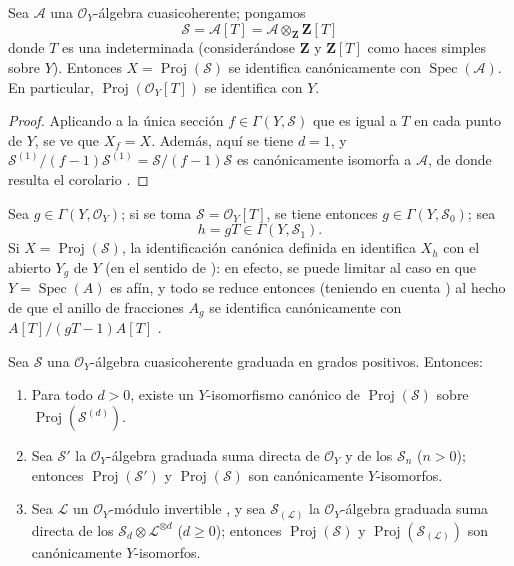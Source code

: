 \documentclass[oneside,10pt]{amsart}
\renewcommand{\geq}{\geqslant}
\newcommand{\oldpage}[2][]{\marginnote{\normalfont\footnotesize\textbf{#1}~|~#2}\ignorespaces}
\let\EGAOriginalLabel\label
\renewcommand{\label}[1]{\phantomsection\EGAOriginalLabel{#1}}
\begin{document}
\begin{corollary}[3.1.7]
\label{II.3.1.7-fr}
Sea $\mathcal{A}$ una $\mathcal{O}_Y$-álgebra cuasicoherente; pongamos
\[
  \mathcal{S}=\mathcal{A}[T]
  =\mathcal{A}\otimes_{\mathbf{Z}}\mathbf{Z}[T]
\]
donde $T$ es una indeterminada (considerándose $\mathbf{Z}$ y $\mathbf{Z}[T]$ como haces simples sobre $Y$).
Entonces $X=\operatorname{Proj}(\mathcal{S})$ se identifica canónicamente con $\operatorname{Spec}(\mathcal{A})$.
En particular, $\operatorname{Proj}(\mathcal{O}_Y[T])$ se identifica con $Y$.
\end{corollary}

\begin{proof}
Aplicando  a la única sección $f\in\Gamma(Y,\mathcal{S})$ que es igual a $T$ en cada punto de $Y$, se ve que $X_f=X$.
Además, aquí se tiene $d=1$, y $\mathcal{S}^{(1)}/(f-1)\mathcal{S}^{(1)}
=\mathcal{S}/(f-1)\mathcal{S}$ es canónicamente isomorfa a $\mathcal{A}$, de donde resulta el corolario .
\end{proof}

Sea $g\in\Gamma(Y,\mathcal{O}_Y)$; si se toma $\mathcal{S}=\mathcal{O}_Y[T]$, se tiene entonces $g\in\Gamma(Y,\mathcal{S}_0)$; sea
\[
  h=gT\in\Gamma(Y,\mathcal{S}_1).
\]
Si $X=\operatorname{Proj}(\mathcal{S})$, la identificación canónica definida en  identifica $X_h$ con el abierto $Y_g$ de $Y$ (en el sentido de ): en efecto, se puede limitar al caso en que $Y=\operatorname{Spec}(A)$ es afín, y todo se reduce entonces (teniendo en cuenta ) al hecho de que el anillo de fracciones $A_g$ se identifica canónicamente con $A[T]/(gT-1)A[T]$ .

\begin{proposition}[3.1.8]
\label{II.3.1.8-fr}
Sea $\mathcal{S}$ una $\mathcal{O}_Y$-álgebra cuasicoherente graduada en grados positivos.
Entonces:
\begin{enumerate}
  \item[(i)] Para todo $d>0$, existe un $Y$-isomorfismo canónico de $\operatorname{Proj}(\mathcal{S})$ sobre $\operatorname{Proj}(\mathcal{S}^{(d)})$.
\oldpage[II]{52}
  \item[(ii)] Sea $\mathcal{S}'$ la $\mathcal{O}_Y$-álgebra graduada suma directa de $\mathcal{O}_Y$ y de los $\mathcal{S}_n$ ($n>0$); entonces $\operatorname{Proj}(\mathcal{S}')$ y $\operatorname{Proj}(\mathcal{S})$ son canónicamente $Y$-isomorfos.
  \item[(iii)] Sea $\mathcal{L}$ un $\mathcal{O}_Y$-módulo invertible , y sea $\mathcal{S}_{(\mathcal{L})}$ la $\mathcal{O}_Y$-álgebra graduada suma directa de los $\mathcal{S}_d\otimes\mathcal{L}^{\otimes d}$ ($d\geq0$); entonces $\operatorname{Proj}(\mathcal{S})$ y $\operatorname{Proj}(\mathcal{S}_{(\mathcal{L})})$ son canónicamente $Y$-isomorfos.
\end{enumerate}
\end{proposition}
\end{document}
